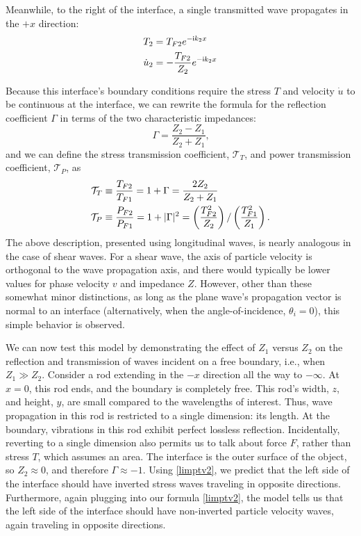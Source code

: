 \documentclass[a4paper,10pt]{report}
\numberwithin{equation}{section}
\begin{document}
Meanwhile, to the right of the interface, a single transmitted wave propagates in the $+x$ direction:
\begin{align}\label{rimptv}
 T_{2} &= T_{F2}e^{-\mathsf{i}k_2x}\notag \\
 \dot{u}_{2} &= -\frac{T_{F2}}{Z_2}e^{-\mathsf{i}k_2x}
\end{align}

Because this interface's boundary conditions require the stress $T$ and velocity $\dot{u}$ to be continuous at the interface, we can rewrite the formula for the reflection coefficient $\Gamma$ in terms of the two characteristic impedances:
\begin{equation}\label{zgamma}
 \Gamma = \frac{Z_2 - Z_1}{Z_2 + Z_1} \text{,}
\end{equation}
and we can define the stress transmission coefficient, $\mathcal{T}_T$, and power transmission coefficient, $\mathcal{T}_P$, as
\begin{align}\label{stc_ptc}
\mathcal{T}_T &\equiv \frac{T_{F2}}{T_{F1}} = 1 + \Gamma = \frac{2Z_2}{Z_2 + Z_1}\notag\\
\mathcal{T}_P &\equiv \frac{P_{F2}}{P_{F1}} = 1 + | \Gamma |^2  = \left(\frac{T_{F2}^2}{Z_2}\right)/\left(\frac{T_{F1}^2}{Z_1}\right) \text{.}
\end{align}
The above description, presented using longitudinal waves, is nearly analogous in the case of shear waves. For a shear wave, the axis of particle velocity is orthogonal to the wave propagation axis, and there would typically be lower values for phase velocity $v$ and impedance $Z$. However, other than these somewhat minor distinctions, as long as the plane wave's propagation vector is normal to an interface (alternatively, when the angle-of-incidence, $\theta_i = 0$), this simple behavior is observed.\cite[pp.~9-14]{Kino1987}

We can now test this model by demonstrating the effect of $Z_1$ versus $Z_2$ on the reflection and transmission of waves incident on a free boundary, i.e., when $Z_1 \gg Z_2$. Consider a rod extending in the $-x$ direction all the way to $-\infty$. At $x = 0$, this rod ends, and the boundary is completely free. This rod's width, $z$, and height, $y$, are small compared to the wavelengths of interest. Thus, wave propagation in this rod is restricted to a single dimension: its length. At the boundary, vibrations in this rod exhibit perfect lossless reflection. Incidentally, reverting to a single dimension also permits us to talk about force $F$, rather than stress $T$, which assumes an area. The interface is the outer surface of the object, so $Z_2 \approx 0$, and therefore $\Gamma \approx -1$. Using \eqref{limptv2}, we predict that the left side of the interface should have inverted stress waves traveling in opposite directions. Furthermore, again plugging into our formula \eqref{limptv2}, the model tells us 
that the left side of the interface should have non-inverted particle velocity waves, again traveling in opposite directions. 
\end{document}
